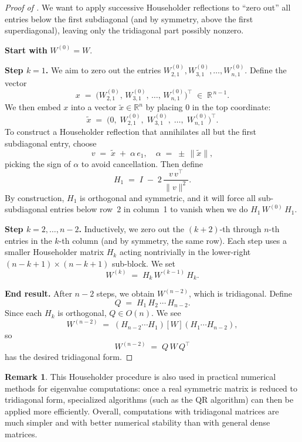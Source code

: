 \documentclass[letterpaper,11pt,oneside,reqno]{article}
\numberwithin{equation}{section}
\theoremstyle{definition}
\newtheorem{remark}[proposition]{Remark}
\begin{document}
\begin{proof}[Proof of ]
We want to apply successive Householder reflections to ``zero out'' all entries below the first subdiagonal (and by symmetry, above the first superdiagonal), leaving only the tridiagonal part possibly nonzero.

\smallskip\noindent\textbf{Start with }\(W^{(0)} = W\).

\smallskip\noindent\textbf{Step \(k=1\).}
   We aim to zero out the entries \(W^{(0)}_{2,1}, W^{(0)}_{3,1}, \dots, W^{(0)}_{n,1}\).  Define the vector
   \[
     x \;=\; \bigl(W^{(0)}_{2,1},\,W^{(0)}_{3,1},\,\dots,\,W^{(0)}_{n,1}\bigr)^\top
     \;\in\;\mathbb{R}^{\,n-1}.
   \]
   We then embed \(x\) into a vector \(\tilde{x} \in \mathbb{R}^{n}\) by placing \(0\) in the top coordinate:
   \[
     \tilde x \;=\; \bigl(0,\;W^{(0)}_{2,1},\;W^{(0)}_{3,1},\;\dots,\;W^{(0)}_{n,1}\bigr)^\top.
   \]
   To construct a Householder reflection that annihilates all but the first subdiagonal entry, choose
   \[
     v \;=\; \tilde x \;+\;\alpha\,e_1,
     \quad
     \alpha \;=\;\pm\,\|\tilde x\|,
   \]
   picking the sign of \(\alpha\) to avoid cancellation.  Then define
   \[
     H_1 \;=\; I \;-\; 2\,\frac{v\,v^\top}{\|v\|^2}.
   \]
   By construction, \(H_1\) is orthogonal and symmetric, and it will force all sub-subdiagonal entries below row~2 in column~1 to vanish when we do \(H_1\,W^{(0)}\,H_1\).

\smallskip\noindent\textbf{Step \(k=2,\dots,n-2\).}
   Inductively, we zero out the \((k+2)\)-th through \(n\)-th entries in the \(k\)-th column (and by symmetry, the same row).  Each step uses a smaller Householder matrix \(H_k\) acting nontrivially in the lower-right \((n-k+1)\times(n-k+1)\) sub-block.  We set
   \[
     W^{(k)} \;=\; H_k \, W^{(k-1)} \, H_k.
   \]

\smallskip\noindent\textbf{End result.}
   After \(n-2\) steps, we obtain \(W^{(n-2)}\), which is tridiagonal.  Define
   \[
     Q \;=\; H_1 \,H_2\,\cdots\,H_{n-2}.
   \]
   Since each \(H_k\) is orthogonal, \(Q\in O(n)\).  We see
   \[
     W^{(n-2)}
     \;=\;
     (H_{n-2}\!\cdots H_1)\,\bigl[\,W\,\bigr]\,(H_1\!\cdots H_{n-2}),
   \]
   so
   \[
     W^{(n-2)}
     \;=\;
     Q \,W \,Q^\top
   \]
   has the desired tridiagonal form.
\end{proof}

\begin{remark}
This Householder procedure is also used in practical numerical methods for eigenvalue computations: once a real symmetric matrix is reduced to tridiagonal form, specialized algorithms (such as the QR algorithm) can then be applied more efficiently.
Overall, computations with tridiagonal matrices are much simpler and with better numerical stability than with general dense matrices.
\end{remark}
\end{document}
